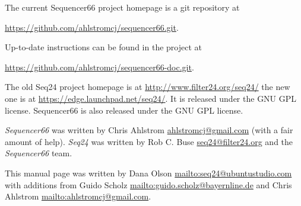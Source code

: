    The current Sequencer66 project homepage is a git repository at

   \url{https://github.com/ahlstromcj/sequencer66.git}.

   Up-to-date instructions can be found in the project at

   \url{https://github.com/ahlstromcj/sequencer66-doc.git}.

   The old Seq24 project homepage is at
   \url{http://www.filter24.org/seq24/} the new
   one is at \url{https://edge.launchpad.net/seq24/}.
   It is released under the GNU GPL license.
   Sequencer66 is also released under the GNU GPL license.

   \textsl{Sequencer66} was written by Chris Ahlstrom
   \href{mailto:ahlstromcj@gmail.com}{ahlstromcj@gmail.com}
   (with a fair amount of help).
   \textsl{Seq24} was written by Rob C. Buse
   \href{mailto:seq24@filter24.org}{seq24@filter24.org}
   and the \textsl{Sequencer66} team.

   This manual page was written by Dana Olson
   \url{mailto:seq24@ubuntustudio.com} with additions from Guido Scholz
   \url{mailto:guido.scholz@bayernline.de} and Chris Ahlstrom
   \url{mailto:ahlstromcj@gmail.com}.


